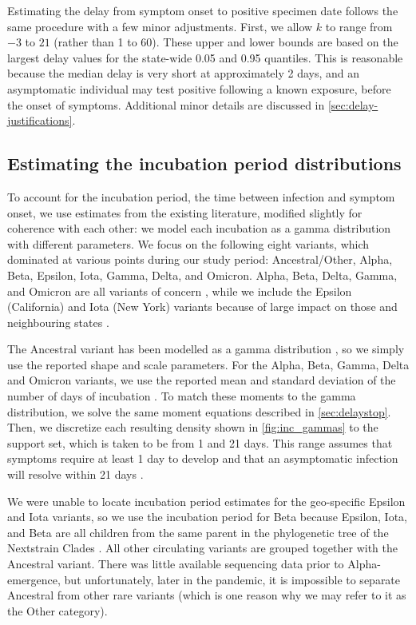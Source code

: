 Estimating the delay from symptom onset to positive specimen date follows the
same procedure with a few minor adjustments. First, we allow $k$ to range from
$-3$ to $21$ (rather than 1 to 60). These upper and lower bounds are based on
the largest delay values for the state-wide 0.05 and 0.95 quantiles. This is
reasonable because the median delay is very short at approximately 2 days, and
an asymptomatic individual may test positive following a known exposure, before
the onset of symptoms. Additional minor details are discussed in
\autoref{sec:delay-justifications}.



\subsection{Estimating the incubation period distributions} 
\label{sec:incubation}

To account for the incubation period, the time between infection and symptom
onset, we use estimates from the existing literature, modified slightly for
coherence with each other: we model each incubation as a gamma distribution with
different parameters. We focus on the following eight variants, which dominated
at various points during our study period: Ancestral/Other, Alpha, Beta, Epsilon,
Iota, Gamma, Delta, and Omicron. Alpha, Beta, Delta, Gamma, and Omicron are all
variants of concern \citep{who2021tracking}, while we include the Epsilon
(California) and Iota (New York) variants because of large impact on those and
neighbouring states \citep{yang2022investigation, duerr2021dominance}.

The Ancestral variant has been modelled as a gamma distribution
\citep{tindale2020evidence}, so we simply use the reported shape and scale parameters. For the
Alpha, Beta, Gamma, Delta and Omicron variants, we use the reported mean and
standard deviation of the number of days of incubation \citep{tanaka2022shorter,
grant2022impact, ogata2022shorter}. To match these moments to the gamma
distribution, we solve the same moment equations described in
\autoref{sec:delaystop}. Then, we discretize each resulting density shown in \autoref{fig:inc_gammas} to the
support set, which is taken to be from 1 and 21 days. This range assumes that
symptoms require at least 1 day to develop \citealp{phcan2021covid} and that an
asymptomatic infection will resolve within 21 days
\citep{zaki2021estimations,cortes2022sars}.

We were unable to locate incubation period estimates for the geo-specific
Epsilon and Iota variants, so we use the incubation period for Beta because
Epsilon, Iota, and Beta are all children from the same parent in the
phylogenetic tree of the Nextstrain Clades \citep{hodcroft2021covariants}. All
other circulating variants are grouped together with the Ancestral variant.
There was little available sequencing data prior to Alpha-emergence, but
unfortunately, later in the pandemic, it is impossible to separate Ancestral
from other rare variants (which is one reason why we may refer to it as the Other category).


